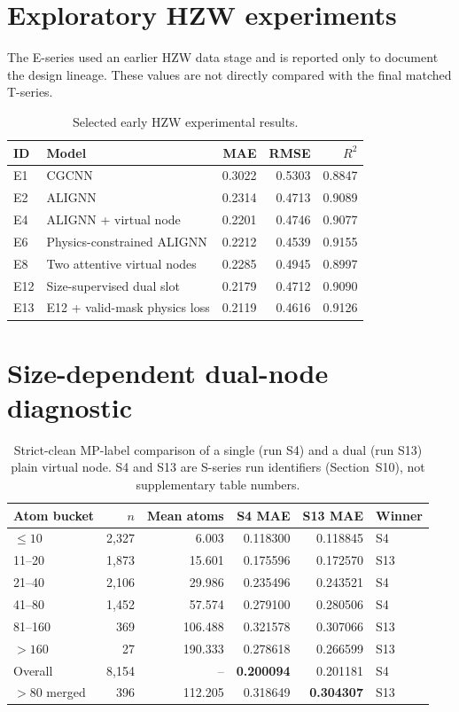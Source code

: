 \documentclass[a4paper,10pt]{article}
\begin{document}
\section{Exploratory HZW experiments}

The E-series used an earlier HZW data stage and is reported only to document the design lineage. These values are not directly compared with the final matched T-series.

\begin{table}[htbp]
\centering
\caption{Selected early HZW experimental results.}
\label{tab:early-hzw}
\small
\begin{tabular}{l l r r r}
\toprule
ID & Model & MAE & RMSE & \(R^2\) \\
\midrule
E1 & CGCNN & 0.3022 & 0.5303 & 0.8847 \\
E2 & ALIGNN & 0.2314 & 0.4713 & 0.9089 \\
E4 & ALIGNN + virtual node & 0.2201 & 0.4746 & 0.9077 \\
E6 & Physics-constrained ALIGNN & 0.2212 & 0.4539 & 0.9155 \\
E8 & Two attentive virtual nodes & 0.2285 & 0.4945 & 0.8997 \\
E12 & Size-supervised dual slot & 0.2179 & 0.4712 & 0.9090 \\
E13 & E12 + valid-mask physics loss & 0.2119 & 0.4616 & 0.9126 \\
\bottomrule
\end{tabular}
\end{table}

\section{Size-dependent dual-node diagnostic}

\begin{table}[htbp]
\centering
\caption{Strict-clean MP-label comparison of a single (run S4) and a dual (run S13) plain virtual node. S4 and S13 are S-series run identifiers (Section~S10), not supplementary table numbers.}
\label{tab:size-buckets}
\small
\begin{tabular}{l r r r r l}
\toprule
Atom bucket & \(n\) & Mean atoms & S4 MAE & S13 MAE & Winner \\
\midrule
\(\le 10\) & 2,327 & 6.003 & 0.118300 & 0.118845 & S4 \\
11--20 & 1,873 & 15.601 & 0.175596 & 0.172570 & S13 \\
21--40 & 2,106 & 29.986 & 0.235496 & 0.243521 & S4 \\
41--80 & 1,452 & 57.574 & 0.279100 & 0.280506 & S4 \\
81--160 & 369 & 106.488 & 0.321578 & 0.307066 & S13 \\
\(>160\) & 27 & 190.333 & 0.278618 & 0.266599 & S13 \\
\midrule
Overall & 8,154 & -- & \textbf{0.200094} & 0.201181 & S4 \\
\(>80\) merged & 396 & 112.205 & 0.318649 & \textbf{0.304307} & S13 \\
\bottomrule
\end{tabular}
\end{table}
\end{document}
